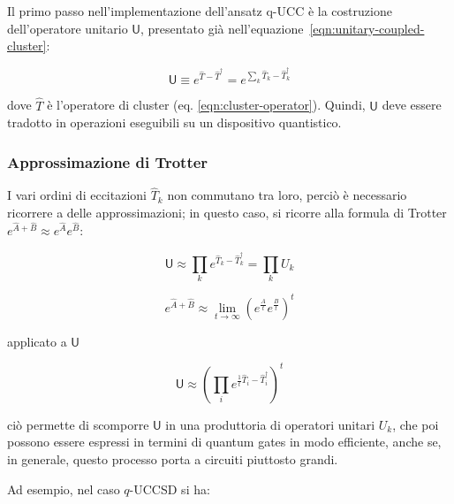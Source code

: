 Il primo passo nell'implementazione dell'ansatz q-UCC è la costruzione dell'operatore unitario $\mathsf{U}$, presentato già nell'equazione~\ref{eqn:unitary-coupled-cluster}:

\begin{equation}\label{eqn:unitary-UCC-transformation}
    \mathsf{U} \equiv e^{\hat{T} - \hat{T}^{\dagger}} = 
    e^{\sum_{k} \hat{T}_k - \hat{T}^{\dagger}_{k}}
\end{equation}

dove $\hat{T}$ è l'operatore di cluster (eq. \ref{eqn:cluster-operator}). Quindi, $\mathsf{U}$ deve essere tradotto in operazioni eseguibili su un dispositivo quantistico.

\subsubsection{Approssimazione di Trotter}

I vari ordini di eccitazioni $\hat{T}_k$ non commutano tra loro, perciò è necessario ricorrere a delle approssimazioni; in questo caso, si ricorre alla formula di Trotter $e^{\hat{A}+\hat{B}} \approx e^{\hat{A}}e^{\hat{B}}$:

\begin{equation}\label{eqn:UCC-Trotter}
    \mathsf{U} \approx 
    \prod_k e^{\hat{T}_k - \hat{T}^{\dagger}_{k}} = \prod_k U_k
\end{equation}


\begin{equation}\label{eqn:formula-di-Trotter}
    e^{\hat{A}+\hat{B}} \approx \lim_{t\rightarrow\infty} 
    \left( 
        e^\frac{A}{t} e^\frac{B}{t}
    \right)^t
\end{equation}

applicato a $\mathsf{U}$

\begin{equation}\label{eqn:UCC-Trotter-2}
    \mathsf{U} \approx 
    \left(
        \prod_i e^{\frac{1}{t} \hat{T}_i - \hat{T}^{\dagger}_{i}} 
    \right)^t
\end{equation}

ciò permette di scomporre $\mathsf{U}$ in una produttoria di operatori unitari $U_k$, che poi possono essere espressi in termini di quantum gates in modo efficiente, anche se, in generale, questo processo porta a circuiti piuttosto grandi.

Ad esempio, nel caso $q$-UCCSD si ha:


